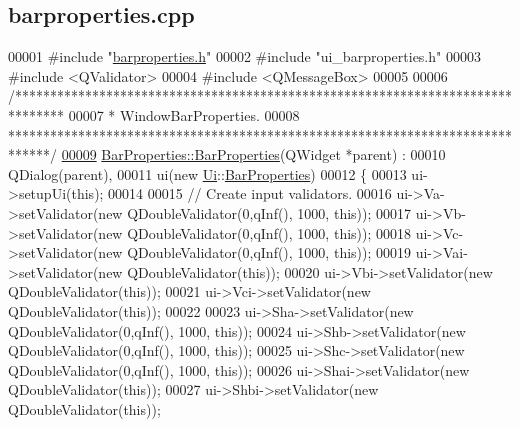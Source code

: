 \hypertarget{barproperties_8cpp_source}{}\subsection{barproperties.\+cpp}
\label{barproperties_8cpp_source}

\begin{DoxyCode}
00001 \textcolor{preprocessor}{#include "\hyperlink{barproperties_8h}{barproperties.h}"}
00002 \textcolor{preprocessor}{#include "ui\_barproperties.h"}
00003 \textcolor{preprocessor}{#include <QValidator>}
00004 \textcolor{preprocessor}{#include <QMessageBox>}
00005 
00006 \textcolor{comment}{/*******************************************************************************}
00007 \textcolor{comment}{ * WindowBarProperties.}
00008 \textcolor{comment}{ ******************************************************************************/}
\hypertarget{barproperties_8cpp_source_l00009}{}\hyperlink{class_bar_properties_a7c14a54f430cabfe872869799076025b}{00009} \hyperlink{class_bar_properties_a7c14a54f430cabfe872869799076025b}{BarProperties::BarProperties}(QWidget *parent) :
00010   QDialog(parent),
00011   ui(new \hyperlink{namespace_ui}{Ui}::\hyperlink{class_bar_properties}{BarProperties})
00012 \{
00013   ui->setupUi(\textcolor{keyword}{this});
00014 
00015   \textcolor{comment}{// Create input validators.}
00016   ui->Va->setValidator(\textcolor{keyword}{new} QDoubleValidator(0,qInf(), 1000, \textcolor{keyword}{this}));
00017   ui->Vb->setValidator(\textcolor{keyword}{new} QDoubleValidator(0,qInf(), 1000, \textcolor{keyword}{this}));
00018   ui->Vc->setValidator(\textcolor{keyword}{new} QDoubleValidator(0,qInf(), 1000, \textcolor{keyword}{this}));
00019   ui->Vai->setValidator(\textcolor{keyword}{new} QDoubleValidator(\textcolor{keyword}{this}));
00020   ui->Vbi->setValidator(\textcolor{keyword}{new} QDoubleValidator(\textcolor{keyword}{this}));
00021   ui->Vci->setValidator(\textcolor{keyword}{new} QDoubleValidator(\textcolor{keyword}{this}));
00022 
00023   ui->Sha->setValidator(\textcolor{keyword}{new} QDoubleValidator(0,qInf(), 1000, \textcolor{keyword}{this}));
00024   ui->Shb->setValidator(\textcolor{keyword}{new} QDoubleValidator(0,qInf(), 1000, \textcolor{keyword}{this}));
00025   ui->Shc->setValidator(\textcolor{keyword}{new} QDoubleValidator(0,qInf(), 1000, \textcolor{keyword}{this}));
00026   ui->Shai->setValidator(\textcolor{keyword}{new} QDoubleValidator(\textcolor{keyword}{this}));
00027   ui->Shbi->setValidator(\textcolor{keyword}{new} QDoubleValidator(\textcolor{keyword}{this}));

\end{DoxyCode}
